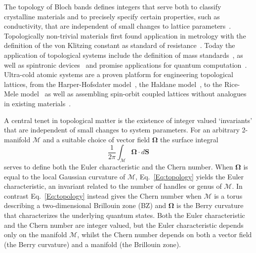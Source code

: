 %
%
The topology of Bloch bands defines integers that serve both to classify crystalline materials and to precisely specify certain properties, such as conductivity, that are independent of small changes to lattice parameters~\cite{hasan_colloquium:_2010}. Topologically non-trivial materials first found application in metrology with the definition of the von Klitzing constant as standard of resistance~\cite{klitzing_new_1980}.  Today the application of topological systems include the definition of mass standards~\cite{newell_codata_2018}, as well as spintronic devices~\cite{zutic_spintronics:_2004} and promise applications for quantum computation~\cite{nayak_non-abelian_2008}. Ultra-cold atomic systems are a proven platform for engineering topological lattices, from the Harper-Hofsdater model~\cite{miyake_realizing_2013,aidelsburger_realization_2013,noauthor_visualizing_nodate,mancini_observation_2015}, the Haldane model~\cite{jotzu_experimental_2014}, to the Rice-Mele model~\cite{lu_geometrical_2016,lohse_thouless_2016} as well as assembling spin-orbit coupled lattices without analogues in existing materials~\cite{noauthor_realization_nodate,sun_highly_2018}.

A central tenet in topological matter is the existence of integer valued `invariants' that are independent of small changes to system parameters. For an arbitrary 2-manifold $\mathcal{M}$ and a suitable choice of vector field $\mathbf{\Omega}$ the surface integral
%
\begin{equation}
	\frac{1}{2\pi}\int_{\mathcal{M}}\mathbf \Omega\cdot d\mathbf S
	\label{Eq:topology}
\end{equation}
%
serves to define both the Euler characteristic and the Chern number. When $\mathbf{\Omega}$ is equal to the local Gaussian curvature of $\mathcal{M}$, Eq.~\ref{Eq:topology} yields the Euler characteristic, an invariant related to the number of handles or genus of $\mathcal{M}$. In contrast Eq.~\ref{Eq:topology} instead gives the Chern number when $\mathcal{M}$ is a torus describing a two-dimensional Brillouin zone (BZ) and $\mathbf{\Omega}$ is the Berry curvature that characterizes the underlying quantum states. Both the Euler characteristic and the Chern number are integer valued, but the Euler characteristic depends only on the manifold $\mathcal{M}$, whilst the Chern number depends on both a vector field (the Berry curvature) and a manifold (the Brillouin zone). 

